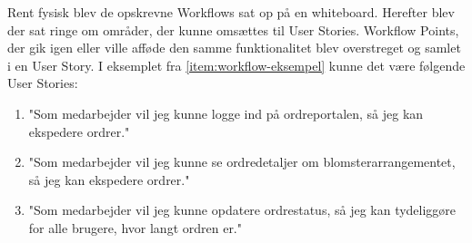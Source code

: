 Rent fysisk blev de opskrevne Workflows sat op på en whiteboard. Herefter blev der sat ringe om områder, der kunne omsættes til User Stories.
Workflow Points, der gik igen eller ville afføde den samme funktionalitet blev overstreget og samlet i en User Story.
I eksemplet fra \ref{item:workflow-eksempel} kunne det være følgende User Stories:
\begin{enumerate}
    \item "Som medarbejder vil jeg kunne logge ind på ordreportalen, så jeg kan ekspedere ordrer."
    \item "Som medarbejder vil jeg kunne se ordredetaljer om blomsterarrangementet, så jeg kan ekspedere ordrer."
    \item "Som medarbejder vil jeg kunne opdatere ordrestatus, så jeg kan tydeliggøre for alle brugere, hvor langt ordren er."
    \label{item:workflow-us-eksempel}
\end{enumerate}

